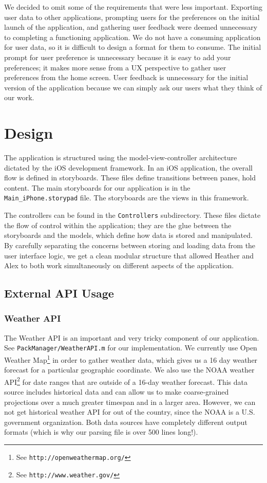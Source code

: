 \documentclass[11pt]{article}
\begin{document}
    We decided to omit some of the requirements that were less important. Exporting user data to other applications, prompting users for the preferences on the initial launch of the application, and gathering user feedback were deemed unnecessary to completing a functioning application. We do not have a consuming application for user data, so it is difficult to design a format for them to consume. The initial prompt for user preference is unnecessary because it is easy to add your preferences; it makes more sense from a UX perspective to gather user preferences from the home screen. User feedback is unnecessary for the initial version of the application because we can simply ask our users what they think of our work.


\section{Design}
    The application is structured using the model-view-controller architecture dictated by the iOS development framework. In an iOS application, the overall flow is defined in storyboards. These files define transitions between panes, hold content. The main storyboards for our application is in the \texttt{Main\_iPhone.storypad} file. The storyboards are the views in this framework.

    The controllers can be found in the \texttt{Controllers} subdirectory. These files dictate the flow of control within the application; they are the glue between the storyboards and the models, which define how data is stored and manipulated. By carefully separating the concerns between storing and loading data from the user interface logic, we get a clean modular structure that allowed Heather and Alex to both work simultaneously on different aspects of the application. 



    \subsection{External API Usage}
    \subsubsection{Weather API}
    The Weather API is an important and very tricky component of our application. See \texttt{PackManager/WeatherAPI.m} for our implementation. We currently use Open Weather Map\footnote{See \texttt{http://openweathermap.org/}} in order to gather weather data, which gives us a 16 day weather forecast for a particular geographic coordinate. We also use the NOAA weather API\footnote{See \texttt{http://www.weather.gov/}} for date ranges that are outside of a 16-day weather forecast. This data source includes historical data and can allow us to make coarse-grained projections over a much greater timespan and in a larger area. However, we can not get historical weather API for out of the country, since the NOAA is a U.S. government organization. Both data sources have completely different output formats (which is why our parsing file is over 500 lines long!).
\end{document}
